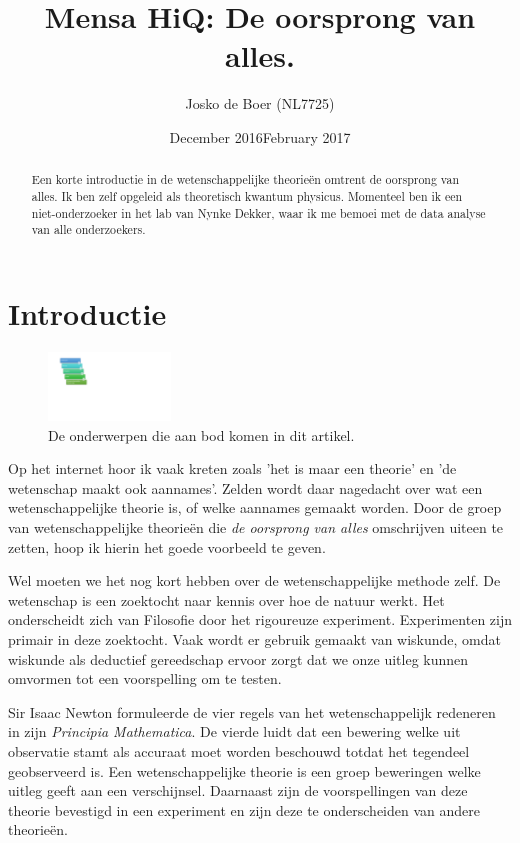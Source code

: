 \documentclass{article}
\title{Mensa HiQ: De oorsprong van alles.}
\author{Josko de Boer (NL7725)}
\date{December 2016}
\date{February 2017}
\begin{document}
\maketitle
\begin{abstract} 
Een korte introductie in de wetenschappelijke theorie\"en omtrent de oorsprong van alles. Ik ben zelf opgeleid als theoretisch kwantum physicus. Momenteel ben ik een niet-onderzoeker in het lab van Nynke Dekker, waar ik me bemoei met de data analyse van alle onderzoekers.
\end{abstract} 
    \section{Introductie}
     
        \begin{figure}
            \begin{center}
                \includegraphics[width=0.29\textwidth, clip, trim=3cm 10cm 23cm 1.5cm]{flowchart}
            \end{center}
            \caption{De onderwerpen die aan bod komen in dit artikel.}
        \end{figure}
        Op het internet hoor ik vaak kreten zoals 'het is maar een theorie' en 'de wetenschap maakt ook aannames'. Zelden wordt daar nagedacht over wat een wetenschappelijke theorie is, of welke aannames gemaakt worden. Door de groep van wetenschappelijke theorie\"en die \emph{de oorsprong van alles} omschrijven uiteen te zetten, hoop ik hierin het goede voorbeeld te geven.
        
        Wel moeten we het nog kort hebben over de wetenschappelijke methode zelf. De wetenschap is een zoektocht naar kennis over hoe de natuur werkt. Het onderscheidt zich van Filosofie door het rigoureuze experiment. Experimenten zijn primair in deze zoektocht. Vaak wordt er gebruik gemaakt van wiskunde, omdat wiskunde als deductief gereedschap ervoor zorgt dat we onze uitleg kunnen omvormen tot een voorspelling om te testen.   
        
        Sir Isaac Newton formuleerde de vier regels van het wetenschappelijk redeneren in zijn \emph{Principia Mathematica}. De vierde luidt dat een bewering welke uit observatie stamt als accuraat moet worden beschouwd totdat het tegendeel geobserveerd is. Een wetenschappelijke theorie is een groep beweringen welke uitleg geeft aan een verschijnsel. Daarnaast zijn de voorspellingen van deze theorie bevestigd in een experiment en zijn deze te onderscheiden van andere theorie\"en.
\end{document}
